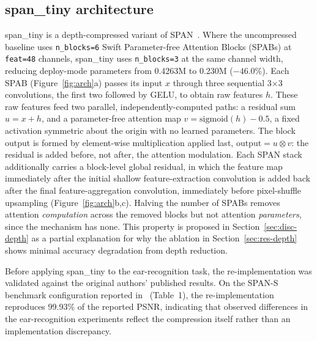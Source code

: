 \documentclass[11pt]{article}
\begin{document}
\subsection{span\_tiny architecture}
\label{sec:arch}

span\_tiny is a depth-compressed variant of SPAN~\cite{wan2024span}. Where the uncompressed baseline uses \texttt{n\_blocks=6} Swift Parameter-free Attention Blocks (SPABs) at \texttt{feat=48} channels, span\_tiny uses \texttt{n\_blocks=3} at the same channel width, reducing deploy-mode parameters from 0.4263M to 0.230M ($-46.0\%$). Each SPAB (Figure~\ref{fig:arch}a) passes its input $x$ through three sequential 3$\times$3 convolutions, the first two followed by GELU, to obtain raw features $h$. These raw features feed two parallel, independently-computed paths: a residual sum $u = x + h$, and a parameter-free attention map $v = \mathrm{sigmoid}(h) - 0.5$, a fixed activation symmetric about the origin with no learned parameters. The block output is formed by element-wise multiplication applied last, $\text{output} = u \otimes v$: the residual is added before, not after, the attention modulation. Each SPAN stack additionally carries a block-level global residual, in which the feature map immediately after the initial shallow feature-extraction convolution is added back after the final feature-aggregation convolution, immediately before pixel-shuffle upsampling (Figure~\ref{fig:arch}b,c). Halving the number of SPABs removes attention \emph{computation} across the removed blocks but not attention \emph{parameters}, since the mechanism has none. This property is proposed in Section~\ref{sec:disc-depth} as a partial explanation for why the ablation in Section~\ref{sec:res-depth} shows minimal accuracy degradation from depth reduction.

Before applying span\_tiny to the ear-recognition task, the re-implementation was validated against the original authors' published results. On the SPAN-S benchmark configuration reported in~\cite{wan2024span} (Table~1), the re-implementation reproduces 99.93\% of the reported PSNR, indicating that observed differences in the ear-recognition experiments reflect the compression itself rather than an implementation discrepancy.
\end{document}
